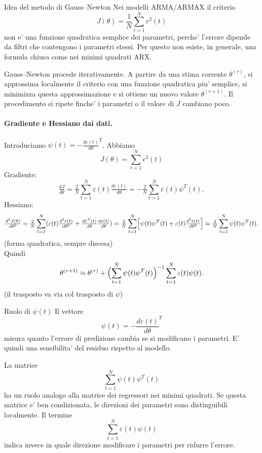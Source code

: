 \documentclass[11pt,a4paper]{article}
\begin{document}
\begin{spiegazione}{Idea del metodo di Gauss--Newton}
Nei modelli ARMA/ARMAX il criterio
\[
J(\theta)=\frac{1}{N}\sum_{t=1}^{N}\varepsilon^2(t)
\]
non e' una funzione quadratica semplice dei parametri, perche' l'errore dipende da filtri che contengono i parametri stessi. Per questo non esiste, in generale, una formula chiusa come nei minimi quadrati ARX.

Gauss--Newton procede iterativamente. A partire da una stima corrente $\theta^{(r)}$, si approssima localmente il criterio con una funzione quadratica piu' semplice, si minimizza questa approssimazione e si ottiene un nuovo valore $\theta^{(r+1)}$. Il procedimento si ripete finche' i parametri o il valore di $J$ cambiano poco.
\end{spiegazione}


\paragraph{Gradiente e Hessiano dai dati.} Introduciamo $\psi(t)=-\tfrac{d\varepsilon(t)}{d\theta}^{T}$, Abbiamo
\[
J(\theta) = \sum_{t=1}^{N} \epsilon^2(t)
\]
Gradiente:
\[
\tfrac{dJ}{d\theta}=\tfrac{2}{N}\sum_{t=1}^{N}\varepsilon(t)\tfrac{d\varepsilon(t)}{d\theta}=-\tfrac{2}{N}\sum_{t=1}^{N}\varepsilon(t)\psi^{T}(t),
\]
Hessiano:
\[
\tfrac{d^2 J(\theta)}{d\theta^2}= \tfrac{2}{N}\sum_{t=1}^{N}(\varepsilon(t)\tfrac{d^2\varepsilon(t)}{d\theta^2} + \tfrac{d\varepsilon^T(t)}{d\theta}\tfrac{d\varepsilon(t)}{d\theta}) =\tfrac{2}{N}\sum_{t=1}^{N}\Bigl[\psi(t)\psi^{T}(t)+\varepsilon(t)\tfrac{d^2\varepsilon(t)}{d\theta^2}\Bigr]\approx\tfrac{2}{N}\sum_{t=1}^{N}\psi(t)\psi^{T}(t).
\]
(forma quadratica, sempre discesa)\\
Quindi
\[
\theta^{(r+1)}\approx\theta^{(r)}+\Bigl(\sum_{t=1}^{N}\psi(t)\psi^{T}(t)\Bigr)^{-1}\sum_{t=1}^{N}\varepsilon(t)\psi(t).
\]
(il trasposto va via col trasposto di $\psi$)

\begin{spiegazione}{Ruolo di $\psi(t)$}
Il vettore
\[
\psi(t)=-\frac{d\varepsilon(t)}{d\theta}^{T}
\]
misura quanto l'errore di predizione cambia se si modificano i parametri. E' quindi una sensibilita' del residuo rispetto al modello.

La matrice
\[
\sum_{t=1}^{N}\psi(t)\psi^T(t)
\]
ha un ruolo analogo alla matrice dei regressori nei minimi quadrati. Se questa matrice e' ben condizionata, le direzioni dei parametri sono distinguibili localmente. Il termine
\[
\sum_{t=1}^{N}\varepsilon(t)\psi(t)
\]
indica invece in quale direzione modificare i parametri per ridurre l'errore.
\end{spiegazione}
\end{document}
